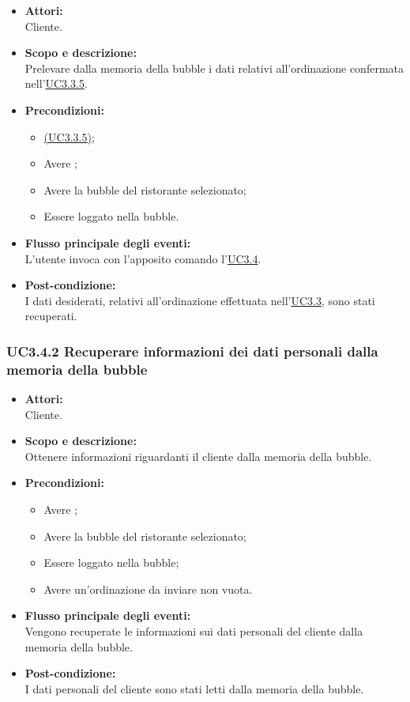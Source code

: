 \begin{itemize}
	\item \textbf{Attori:}
	\\Cliente.
	\item \textbf{Scopo e descrizione:} 
	\\Prelevare dalla memoria della bubble i dati relativi all'ordinazione confermata nell’\hyperref[UC3.3.5]{UC3.3.5}.
	\item \textbf{Precondizioni:}
	\begin{itemize}
		\item \hyperref[UC3.3.5]{(UC3.3.5)};
		\item Avere ;
		\item Avere la bubble del ristorante selezionato;
		\item Essere loggato nella bubble.
	\end{itemize}
	\item \textbf{Flusso principale degli eventi:}
	\\L'utente invoca con l'apposito comando l’\hyperref[UC3.4]{UC3.4}.
	\item \textbf{Post-condizione:}
	\\I dati desiderati, relativi all'ordinazione effettuata nell’\hyperref[UC3.3]{UC3.3}, sono stati recuperati. 
\end{itemize}

\subsubsection{UC3.4.2 Recuperare informazioni dei dati personali dalla memoria della bubble} \label{UC3.4.2}

\begin{itemize}
	\item \textbf{Attori:}
	\\Cliente.
	\item \textbf{Scopo e descrizione:} 
	\\Ottenere informazioni riguardanti il cliente dalla memoria della bubble.
	\item \textbf{Precondizioni:}
	\begin{itemize}
		\item Avere ;
		\item Avere la bubble del ristorante selezionato;
		\item Essere loggato nella bubble;
		\item Avere un'ordinazione da inviare non vuota.
	\end{itemize}
	\item \textbf{Flusso principale degli eventi:}
	\\Vengono recuperate le informazioni sui dati personali del cliente dalla memoria della bubble.
	\item \textbf{Post-condizione:}
	\\I dati personali del cliente sono stati letti dalla memoria della bubble.
\end{itemize}

